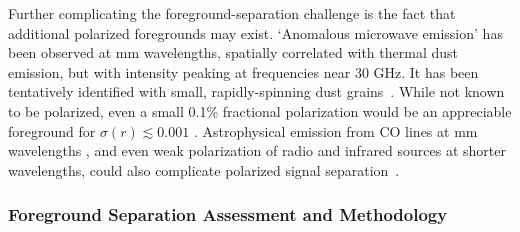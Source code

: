 \documentclass[PICOReport.tex]{subfiles}
\begin{document}
Further complicating the foreground-separation challenge is the fact that additional polarized foregrounds may exist.  `Anomalous microwave emission'  has been observed at mm wavelengths, spatially correlated with thermal dust emission, but with intensity peaking at frequencies near 30 GHz. It has been tentatively identified with small, rapidly-spinning dust grains~\citep{dickinson/etal:2018}. While not known to be polarized, even a small 0.1\% fractional polarization would be an appreciable foreground for $\sigma(r) \lesssim 0.001$ .  Astrophysical emission from CO lines at mm wavelengths , and even weak  polarization of radio and infrared sources at shorter wavelengths, could also complicate polarized signal separation~\citep{trombetti2018_fracpol, puglisi2018_polsource}.

\subsubsection{Foreground Separation Assessment and Methodology}
\label{sec:foreground_separation_methodology}



\end{document}
